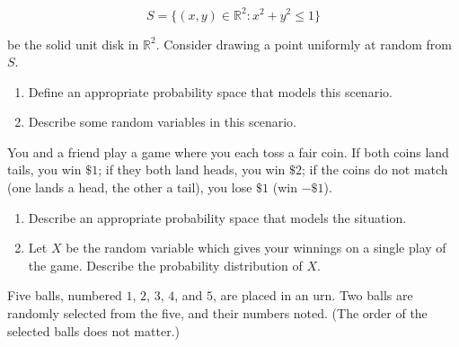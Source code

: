 \documentclass[12pt,reqno]{amsart}
\begin{document}
	\[
	S = \{ (x,y) \in \mathbb{R}^2 : x^2+y^2 \leq 1\}
	\]

be the solid unit disk in $\mathbb{R}^2$. Consider drawing a point uniformly at random from $S$.

\medskip
\begin{enumerate}
\item Define an appropriate probability space that models this scenario.\vfill
\item Describe some random variables in this scenario.\vfill
\end{enumerate}



























\bigskip
\prob You and a friend play a game where you each toss a fair coin. If both coins land tails, you win $\$1$; if they both land heads, you win $\$2$; if the coins do not match (one lands a head, the other a tail), you lose $\$1$ (win $-\$1$).

\medskip
\begin{enumerate}
\item Describe an appropriate probability space that models the situation.\vfill
\item Let $X$ be the random variable which gives your winnings on a single play of the game. Describe the probability distribution of $X$.\vfill
\end{enumerate}























\newpage
\prob Five balls, numbered $1$, $2$, $3$, $4$, and $5$, are placed in an urn. Two balls are randomly selected from the five, and their numbers noted. (The order of the selected balls does not matter.)
\end{document}
